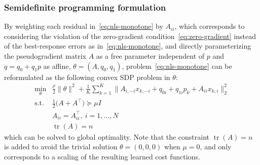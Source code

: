 \documentclass[11pt, a4paper]{article}
\DeclareMathOperator{\tr}{\mathrm{tr}}
\theoremstyle{remark}
\theoremstyle{plain}
\begin{document}
\subsubsection{Semidefinite programming formulation}
By weighting each residual in~\eqref{eq:nls-monotone} by $A_{ii}$, which
corresponds to considering the violation of the zero-gradient condition~\eqref{eq:zero-gradient}
instead of the best-response errors as in~\eqref{eq:nls-monotone}, and directly parameterizing the pseudogradient matrix $A$ as a free parameter independent of $p$ and $q=q_0+q_1 p$ as affine, $\theta=(A,q_0, q_1)$, problem~\eqref{eq:nls-monotone} can be reformulated as the following convex SDP problem in $\theta$:
\begin{equation}
    \begin{aligned}
    \min_\theta &\frac{\rho}{2}\|\theta\|^2 \!+\!
        \frac{1}{K}\sum_{k=1}^{K}
        \bigl\| A_{i,-i} x_{k,-i} + q_{0i}+q_{1i} p_k + A_{ii}{x}_{k,i} \bigr\|_2^2\\
    \textrm{s.t. } &\tfrac{1}{2}\bigl( A + A^\top \bigr) \succeq \mu I\\
    & A_{ii} = A_{ii}^\top,\  i = 1, \ldots, N\\
    & \tr(A)=n
    \end{aligned}
\label{eq:sdp-monotone}
\end{equation}
which can be solved to global optimality. Note that the constraint $\tr(A)=n$ is added to avoid the trivial solution $\theta=(0,0,0)$ when $\mu=0$, and only corresponds to a scaling of the resulting
learned cost functions.
\end{document}
